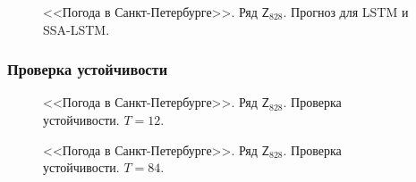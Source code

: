 \documentclass[specialist,
               substylefile = spbu.rtx,
               subf,href,colorlinks=true, 12p]{disser}
\begin{document}
\begin{figure}[H]
	\caption{<<Погода в Санкт-Петербурге>>. Ряд $\mathsf{Z}_{828}$. Прогноз для LSTM и SSA-LSTM.}
	\label{weather_res_lstm}
\end{figure}

\subsubsection{Проверка устойчивости}
\label{aweather_rob}
\begin{figure}[H]
	\captionsetup{justification=centering}
	\caption{<<Погода в Санкт-Петербурге>>. Ряд $\mathsf{Z}_{828}$. Проверка устойчивости. $T = 12$.}
	\label{weather.loops.12}
\end{figure}

\begin{figure}[H]
	\captionsetup{justification=centering}
	\caption{<<Погода в Санкт-Петербурге>>. Ряд $\mathsf{Z}_{828}$. Проверка устойчивости. $T = 84$.}
	\label{weather.loops.156}
\end{figure}
\end{document}

